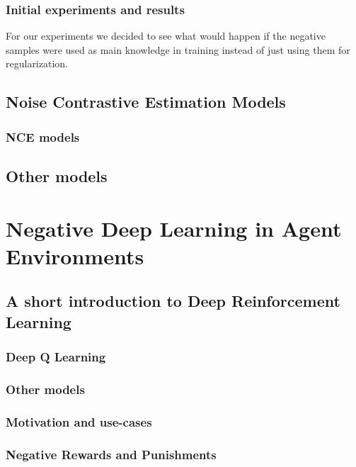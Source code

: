 \documentclass[b5paper]{book}
\begin{document}
\section{Initial experiments and results}

For our experiments we decided to see what would happen if the negative samples were used as main knowledge in training instead of just using them for regularization. 


\chapter{Noise Contrastive Estimation Models}
\section{NCE models}

\chapter{Other models}

\part{Negative Deep Learning in Agent Environments}

\chapter{A short introduction to Deep Reinforcement Learning}
\section{Deep Q Learning}
\section{Other models}

\section{Motivation and use-cases}
\section{Negative Rewards and Punishments}
\end{document}
